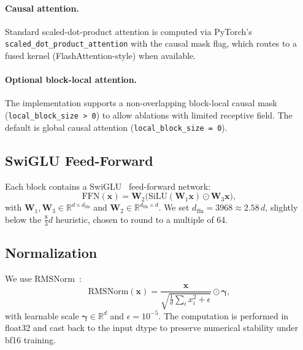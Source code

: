 \documentclass[11pt,a4paper]{article}
\begin{document}
\paragraph{Causal attention.}
Standard scaled-dot-product attention is computed via
PyTorch's \texttt{scaled\_dot\_product\_attention} with the causal mask flag,
which routes to a fused kernel (FlashAttention-style) when available.

\paragraph{Optional block-local attention.}
The implementation supports a non-overlapping block-local causal mask
(\texttt{local\_block\_size > 0}) to allow ablations with limited
receptive field. The default is global causal attention (\texttt{local\_block\_size = 0}).

\subsection{SwiGLU Feed-Forward}

Each block contains a SwiGLU~\cite{swiglu} feed-forward network:
\begin{equation}
\mathrm{FFN}(\mathbf{x}) = \mathbf{W}_2 \bigl( \mathrm{SiLU}(\mathbf{W}_1 \mathbf{x}) \odot \mathbf{W}_3 \mathbf{x} \bigr),
\end{equation}
with $\mathbf{W}_1, \mathbf{W}_3 \in \mathbb{R}^{d \times d_{\mathrm{ffn}}}$
and $\mathbf{W}_2 \in \mathbb{R}^{d_{\mathrm{ffn}} \times d}$. We set
$d_{\mathrm{ffn}} = 3968 \approx 2.58\,d$, slightly below the
$\frac{8}{3}d$ heuristic, chosen to round to a multiple of 64.

\subsection{Normalization}

We use RMSNorm~\cite{rmsnorm}:
\begin{equation}
\mathrm{RMSNorm}(\mathbf{x}) = \frac{\mathbf{x}}{\sqrt{\frac{1}{d}\sum_i x_i^2 + \epsilon}} \odot \boldsymbol{\gamma},
\end{equation}
with learnable scale $\boldsymbol{\gamma} \in \mathbb{R}^d$ and
$\epsilon = 10^{-5}$. The computation is performed in float32 and cast back
to the input dtype to preserve numerical stability under bf16 training.
\end{document}
